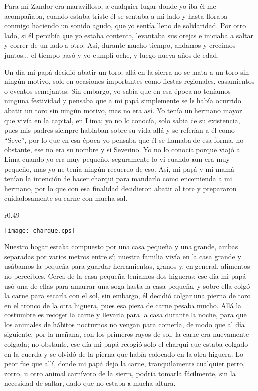 Para mí Zandor era maravilloso, a cualquier lugar donde yo iba él me acompañaba, cuando estaba triste él se sentaba a mi lado y hasta lloraba conmigo haciendo un sonido agudo, que yo sentía lleno de solidaridad.
Por otro lado, si él percibía que yo estaba contento, levantaba sus orejas e iniciaba a saltar y correr de un lado a otro. Así, durante mucho tiempo, andamos y crecimos juntos... el tiempo pasó y yo cumplí ocho, y luego nueva años de edad.

Un día mi papá decidió abatir un toro; allá en la sierra no se mata a un toro sin ningún motivo, solo en ocasiones importantes como fiestas regionales, casamientos o eventos semejantes. Sin embargo, yo sabía que en esa época no teníamos ninguna festividad y pensaba que a mi papá simplemente se le había ocurrido abatir un toro sin ningún motivo, mas no era así.
Yo tenía un hermano mayor que vivía en la capital, en Lima; yo no lo conocía, solo sabia de su existencia, pues mis padres siempre hablaban sobre su vida allá y se referían a él como ``Seve'', por lo que en esa época yo pensaba que él se llamaba de esa forma, no obstante, ese no era su nombre y si Severino. Yo no lo conocía porque viajó a Lima cuando yo era muy pequeño, seguramente lo vi cuando aun era muy pequeño, mas yo no tenia ningún recuerdo de eso.
Así, mi papá y mi mamá tenían la intención de hacer charqui para mandarlo como encomienda a mi hermano, por lo que con esa finalidad decidieron abatir al toro y prepararon cuidadosamente su carne con mucha sal.

\ifdefined\EnableIncludeImages
\begin{wrapfigure}{r}{0.49\textwidth}
  \begin{center}
  \vspace{-20pt}
    \texttt{[image: charque.eps]}
  \end{center}
  \vspace{-20pt}
\end{wrapfigure}
\fi
Nuestro hogar estaba compuesto por una casa pequeña y una grande, ambas separadas por varios metros entre sí; nuestra familia vivía en la casa grande y usábamos la pequeña para guardar herramientas, granos y, en general, alimentos no perecibles.
Cerca de la casa pequeña teníamos dos higueras; ese día mi papá usó una de ellas para amarrar una soga hasta la casa pequeña, y sobre ella colgó la carne para secarla con el sol, sin embargo, él decidió colgar una pierna de toro en el tronco de la otra higuera, pues esa pieza de carne pesaba mucho.
Allá la costumbre es recoger la carne y llevarla para la casa durante la noche, para que los animales de hábitos nocturnos no vengan para comerla, de modo que al día siguiente, por la mañana, con los primeros rayos de sol, la carne era nuevamente colgada; no obstante, ese día mi papá recogió solo el charqui que estaba colgado en la cuerda y se olvidó de la pierna que había colocado en la otra higuera.
Lo peor fue que allí, donde mi papá dejo la carne, tranquilamente cualquier perro, zorro, u otro animal carnívoro de la sierra, podría tomarla fácilmente, sin la necesidad de saltar, dado que no estaba a mucha altura.

